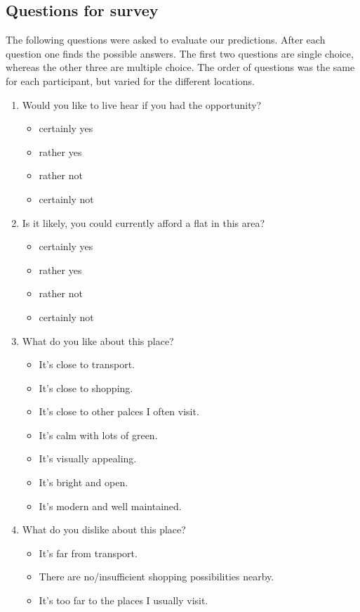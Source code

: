 \documentclass[letterpaper]{article}
\begin{document}
\subsection{Questions for survey}\label{app:questions}
The following questions were asked to evaluate our predictions. After each question one finds the possible answers. The first two questions are single choice, whereas the other three are multiple choice. The order of questions was the same for each participant, but varied for the different locations.
\begin{enumerate}
	\item Would you like to live hear if you had the opportunity?
	\begin{itemize}
		\item certainly yes
		\item rather yes
		\item rather not
		\item certainly not
	\end{itemize}
	\item Is it likely, you could currently afford a flat in this area?
	\begin{itemize}
		\item certainly yes
		\item rather yes
		\item rather not
		\item certainly not
	\end{itemize}
	\item What do you like about this place?
	\begin{itemize}
		\item It's close to transport.
		\item It's close to shopping.
		\item It's close to other palces I often visit.
		\item It's calm with lots of green.
		\item It's visually appealing.
		\item It's bright and open.
		\item It's modern and well maintained.
	\end{itemize}
	\item What do you dislike about this place?
	\begin{itemize}
		\item It's far from transport.
		\item There are no/insufficient shopping possibilities nearby.
		\item It's too far to the places I usually visit.

\end{itemize}
\end{enumerate}
\end{document}
